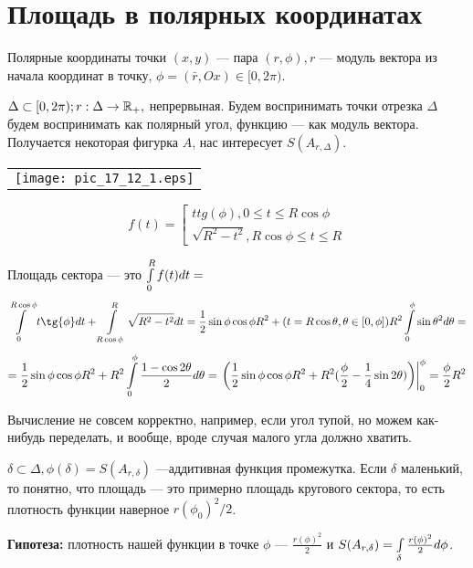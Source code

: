 \documentclass[12pt]{report}
\begin{document}
\section{Площадь в полярных координатах}

\begin{defn}
Полярные координаты точки $(x, y)$ --- пара $(r, \phi), r$ --- модуль вектора из начала координат в точку, $\phi = (\bar{r}, Ox) \in [0, 2\pi)$.

$\Delta \subset [0, 2\pi); r: \Delta \to \mathbb{R}_{+},$ непрервыная. Будем воспринимать точки отрезка $\Delta$ будем воспринимать как полярный угол, функцию --- как модуль вектора. Получается некоторая фигурка $A$, нас интересует $S(A_{r, \Delta})$.


\begin{center}
\begin{tabular}{c}
\texttt{[image: pic\_17\_12\_1.eps]}\\
\end{tabular}
\end{center}
\end{defn}

\begin{rem}
$$f(t) = \left[
\begin{matrix}
ttg(\phi), 0 \le t \le R\cos{\phi}\\
\sqrt{R^2 - t^2}, R\cos{\phi} \le t \le R
\end{matrix}\right.
$$

Площадь сектора --- это $\int\limits_0^R{f(t)dt} = $
$$\ilim_0^{R\cos{\phi}}{t\tg{\phi}dt} + \ilim_{R\cos{\phi}}^R{\sqrt{R^2 - t^2}dt} = \frac{1}{2}\sin{\phi}\cos{\phi}R^2 + (t = R\cos{\theta}, \theta \in [0, \phi]) R^2\ilim_0^\phi{\sin{\theta}^2d\theta} = $$ 
$$=  \frac{1}{2}\sin{\phi}\cos{\phi}R^2 + R^2\int\limits_0^\phi{\frac{1 - \cos{2\theta}}{2}d\theta} = \left.\left(\frac{1}{2}\sin{\phi}\cos{\phi}R^2 + R^2(\frac{\phi}{2} - \frac{1}{4}\sin{2\theta})\right)\right|_0^\phi = \frac{\phi}{2}R^2$$

Вычисление не совсем корректно, например, если угол тупой, но можем как-нибудь переделать, и вообще, вроде случая малого угла должно хватить.
\end{rem}

$\delta \subset \Delta, \phi(\delta) = S(A_{r, \delta})$ ---аддитивная функция промежутка. Если $\delta$ маленький, то понятно, что площадь --- это примерно площадь кругового сектора, то есть плотность функции наверное $r(\phi_0)^2/2$.

{\bfseries Гипотеза:} плотность нашей функции в точке $\phi$ --- $\frac{r(\phi)^2}{2}$ и $S(A_{r, \delta}) = \int\limits_\delta{\frac{r(\phi)^2}{2}d\phi}$.
\end{document}
